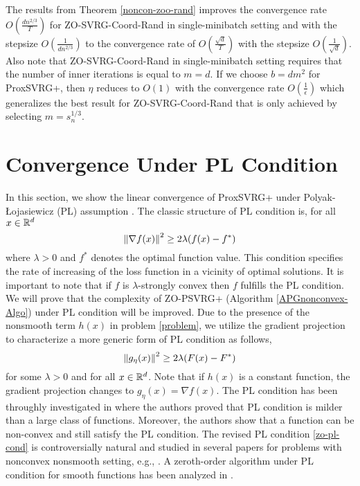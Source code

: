 \begin{remark}
The results from Theorem \ref{noncon-zoo-rand} improves the convergence rate $O(\frac{d{n}^{2/3}}{T})$ for ZO-SVRG-Coord-Rand \cite{ji2019improved} in single-minibatch setting  and   with the stepsize $O(\frac{1}{dn^{2/3}})$ to the convergence rate of $O(\frac{\sqrt{d}}{T})$
with the stepsize $O(\frac{1}{\sqrt{d}})$. Also note that ZO-SVRG-Coord-Rand in single-minibatch setting requires that the number of inner iterations is equal to $m = d$. If we
choose $b = d m^2$ for ProxSVRG+, then $\eta$ reduces to $O(1)$ with the convergence rate $O(\frac{1}{\epsilon})$ which generalizes the best result for ZO-SVRG-Coord-Rand that is only achieved by selecting $m = s_n^{1/3}$.
\end{remark}
\section{Convergence Under PL Condition}
In this section, we show the linear convergence of  ProxSVRG+ under Polyak-Łojasiewicz (PL) assumption \cite{polyak1963gradient}.
The classic structure of PL condition is, for all $x\in\mathbb{R}^d$
\begin{equation}
\left\lVert\nabla f(x)\right\rVert^2 \geq 2\lambda (f(x) - f^*)
\end{equation}
where $\lambda >0$ and $f^*$ denotes the optimal function value. This condition specifies the rate of increasing of the loss function in a vicinity of optimal solutions. It is important to note that if $f$ is $\lambda$-strongly convex then $f$ fulfills the PL condition. We will prove that the complexity of ZO-PSVRG+ (Algorithm \ref{APGnonconvex-Algo}) under PL condition will be improved.
Due to the presence of the nonsmooth term $h(x)$ in problem \eqref{problem}, we utilize the gradient projection to characterize a more generic form of PL condition as follows, 
\begin{equation}\label{zo-pl-cond}
\norm{g_{\eta}(x)}^2 \geq 2\lambda (F(x) - F^*)
\end{equation}
for some $\lambda >0$ and for all $x\in\mathbb{R}^d$. Note that if $h(x)$ is a constant function, the gradient projection changes to $g_{\eta}(x) = \nabla f(x)$.
The PL condition has been throughly investigated  in \cite{karimi2016linear} where the authors proved that PL condition is milder than a large class of  functions. Moreover, the authors show that a function can be non-convex and still satisfy the PL condition. The revised PL condition \eqref{zo-pl-cond} is controversially natural and studied in several papers for problems with nonconvex nonsmooth setting, e.g., \cite{li2018simple}. A zeroth-order algorithm under PL condition for smooth functions has been analyzed in \cite{ji2019improved}.
